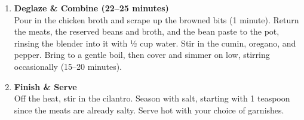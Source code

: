 \begin{enumerate}
      \item \textbf{Deglaze \& Combine (22--25 minutes)} \\
            Pour in the chicken broth and scrape up the browned bits (1 minute). Return the meats, the reserved beans and broth, and the bean paste to the pot, rinsing the blender into it with ½ cup water. Stir in the cumin, oregano, and pepper. Bring to a gentle boil, then cover and simmer on low, stirring occasionally (15--20 minutes).

      \item \textbf{Finish \& Serve} \\
            Off the heat, stir in the cilantro. Season with salt, starting with 1 teaspoon since the meats are already salty. Serve hot with your choice of garnishes.

\end{enumerate}


